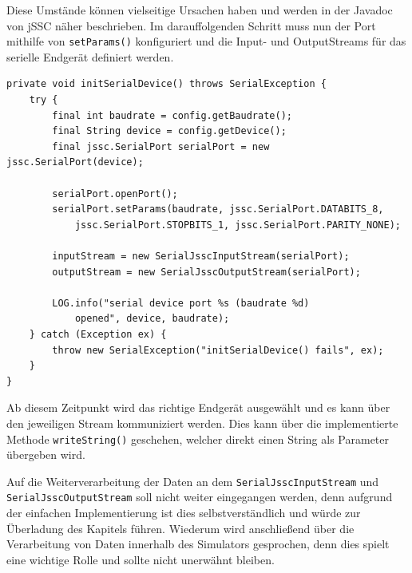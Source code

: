 Diese Umstände können vielseitige Ursachen haben und werden in der Javadoc von jSSC näher beschrieben.
Im darauffolgenden Schritt muss nun der Port mithilfe von \lstinline[style=java]{setParams()} konfiguriert und die Input- und OutputStreams für das serielle Endgerät definiert werden.
%
\begin{lstlisting}[style=java,caption=Methode initSimulation(),label=fdsafdsafds]
private void initSerialDevice() throws SerialException {
    try {
        final int baudrate = config.getBaudrate();
        final String device = config.getDevice();
        final jssc.SerialPort serialPort = new jssc.SerialPort(device);

        serialPort.openPort();
        serialPort.setParams(baudrate, jssc.SerialPort.DATABITS_8,
            jssc.SerialPort.STOPBITS_1, jssc.SerialPort.PARITY_NONE);

        inputStream = new SerialJsscInputStream(serialPort);
        outputStream = new SerialJsscOutputStream(serialPort);

        LOG.info("serial device port %s (baudrate %d)
            opened", device, baudrate);
    } catch (Exception ex) {
        throw new SerialException("initSerialDevice() fails", ex);
    }
}
\end{lstlisting}
Ab diesem Zeitpunkt wird das richtige Endgerät ausgewählt und es kann über den jeweiligen Stream kommuniziert werden.
Dies kann über die implementierte Methode \lstinline[style=java]{writeString()} geschehen, welcher direkt einen String als Parameter übergeben wird.

Auf die Weiterverarbeitung der Daten an dem \lstinline[style=java]{SerialJsscInputStream} und \lstinline[style=java]{SerialJsscOutputStream} soll nicht weiter eingegangen werden, denn aufgrund der einfachen Implementierung ist dies selbstverständlich und würde zur Überladung des Kapitels führen.
Wiederum wird anschließend über die Verarbeitung von Daten innerhalb des Simulators gesprochen, denn dies spielt eine wichtige Rolle und sollte nicht unerwähnt bleiben.
